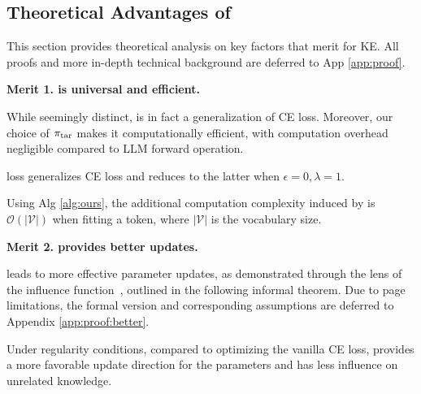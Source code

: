 \subsection{Theoretical Advantages of {\NAME}}

This section provides theoretical analysis on key factors that merit {\NAME} for KE.
All proofs and more in-depth technical background are deferred to App \ref{app:proof}. 

\textbf{Merit 1. {\NAME} is universal and efficient.}

While seemingly distinct, {\NAME} is in fact a generalization of CE loss.
Moreover, our choice of $\pi_\text{tar}$ makes it computationally efficient, with computation overhead negligible compared to LLM forward operation.
\begin{proposition}
\label{prop:gen-ce}
{\NAME} loss generalizes CE loss and reduces to the latter when $\epsilon = 0, \lambda = 1$.
\end{proposition}
% 
\begin{proposition}
\label{prop:efficiency}
Using Alg \ref{alg:ours}, the additional computation complexity induced by {\NAME} is $\mathcal O(|\mathcal V|)$ when fitting a token, where $|\mathcal V|$ is the vocabulary size. 
\end{proposition}

\textbf{Merit 2. {\NAME} provides better updates.}

{\NAME} leads to more effective parameter updates, as demonstrated through the lens of the influence function~\citep{koh2017understanding}, outlined in the following informal theorem. Due to page limitations, the formal version and corresponding assumptions are deferred to Appendix \ref{app:proof:better}.

\begin{theorem}[Informal] \label{thm:better} Under regularity conditions, compared to optimizing the vanilla CE loss, {\NAME} provides a more favorable update direction for the parameters and has less influence on unrelated knowledge. \end{theorem}








